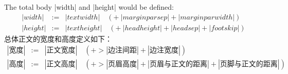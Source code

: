 \begin{paracol}{2}
The total body |width| and |height| would be defined:
\begin{eqnarray}
\label{eq:width}
|width| &:=& |textwidth| \quad( +\>  |marginparsep| + |marginparwidth| )\\
|height| &:=& |textheight| \quad(+\> |headheight| + |headsep| + |footskip| )
\label{eq:height}
\end{eqnarray}
\switchcolumn
总体正文的宽度和高度定义如下：
\begin{eqnarray}
\label{eq:width}
|宽度| &:=& |正文宽度| \quad( +> |边注间距| + |边注宽度| )\\
|高度| &:=& |正文高度| \quad(+> |页眉高度| + |页眉与正文的距离| + |页脚与正文的距离| )
\label{eq:height}
\end{eqnarray}


\end{paracol}



    


